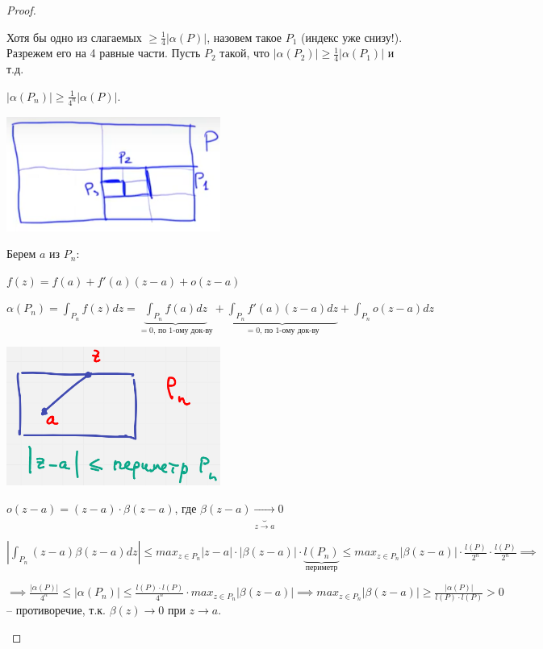 \begin{proof}
\begin{enumerate}
{            Хотя бы одно из слагаемых $\geq \frac{1}{4} |\alpha(P)|$, назовем такое $P_1$ (индекс уже снизу!). Разрежем его на 4 равные части. Пусть $P_2$ такой, что $|\alpha(P_2)| \geq \frac{1}{4} |\alpha (P_1)|$ и т.д.

            $|\alpha(P_n)| \geq \frac{1}{4^n} |\alpha (P)|$.

            \begin{center}
                \includegraphics[width=7cm]{assets/04-functions-of-complex-variables/Cauchy-theorem-rectangle-partition-2.png}
            \end{center}

            Берем $a$ из $P_n$:

            $f(z) = f(a) + f'(a) (z - a) + o(z - a)$

            $\alpha (P_n) = \int_{P_n} { f(z) dz } = \underbrace{\int_{P_n} { f(a) dz }}_{= 0 \text{, по 1-ому док-ву}} + \underbrace{\int_{P_n} { f'(a) (z - a) dz }}_{= 0 \text{, по 1-ому док-ву}} + \int_{P_n} { o(z - a) dz }$


            \begin{center}
                \includegraphics[width=7cm]{assets/04-functions-of-complex-variables/Cauchy-theorem-rectangle-partition-3.png}
            \end{center}


            $o(z - a) = (z - a) \cdot \beta (z - a)$, где $\beta(z - a) \underbrace{\rightarrow}_{z \rightarrow a} 0$

            $\left| \int_{P_n} {(z - a) \beta (z - a) dz} \right| \leq max_{z \in P_n} { |z - a| \cdot |\beta (z - a)| } \cdot \underbrace{l(P_n)}_{\text{периметр}} \leq max_{z \in P_n} { |\beta (z - a)| } \cdot \frac{l(P)}{2^n} \cdot \frac{l(P)}{2^n} \implies$

            $\implies \frac{|\alpha (P)|}{4^n} \leq |\alpha(P_n)| \leq \frac{l(P) \cdot l(P)}{4^n} \cdot max_{z \in P_n} |\beta (z - a)| \implies max_{z \in P_n} |\beta (z - a)| \geq \frac{|\alpha (P)|}{l(P) \cdot l(P)} > 0$ -- противоречие, т.к. $\beta(z) \rightarrow 0$ при $z \rightarrow a$.
        }
    \end{enumerate}
\end{proof}
